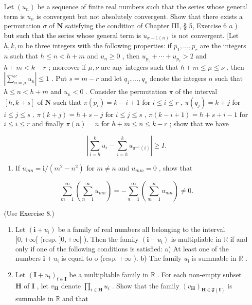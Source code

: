 \begin{enumerate}
  Let \((u_n)\) be a sequence of finite real numbers such that the series whose general term is \(u_n\) is convergent but not absolutely convergent. Show that there exists a permutation \(\sigma\) of \(\mathbf{N}\) satisfying the condition of Chapter III, § 5, Exercise 6 \(a\) ) but such that the series whose general term is \(u_{\sigma - 1(n)}\) is not convergent. {[}Let \(h, k, m\) be three integers with the following properties: if \(p_1, \ldots, p_r\) are the integers \(n\) such that \(h \leqslant n < h + m\) and \(u_n \geqslant 0\) , then \(u_{p_1} + \cdots + u_{p_r} > 2\) and \(h + m < k - r\) ; moreover if \(\mu, \nu\) are any integers such that \(h + m \leqslant \mu \leqslant \nu\) , then \(\left|\sum_{n = \mu}^{\nu} u_n\right| \leqslant 1\) . Put \(s = m - r\) and let \(q_1, \ldots, q_s\) denote the integers \(n\) such that \(h \leqslant n < h + m\) and \(u_n < 0\) . Consider the permutation \(\pi\) of the interval \([h, k + s]\) of \(\mathbf{N}\) such that \(\pi(p_i) = k - i + 1\) for \(i \leqslant i \leqslant r\) , \(\pi(q_j) = k + j\) for \(i \leqslant j \leqslant s\) , \(\pi(k + j) = h + s - j\) for \(i \leqslant j \leqslant s\) , \(\pi(k - i + 1) = h + s + i - 1\) for \(i \leqslant i \leqslant r\) and finally \(\pi(n) = n\) for \(h + m \leqslant n \leqslant k - r\) ; show that we have
\end{enumerate}

\[
\left| \sum_ {i = h} ^ {k} u _ {i} - \sum_ {i = h} ^ {k} u _ {\pi^ {- 1} (i)} \right| \geqslant I.
\]

\begin{enumerate}
\def\labelenumi{\arabic{enumi})}
\setcounter{enumi}{16}
\tightlist
\item
  If \(u_{mn} = \mathbf{i} / (m^2 - n^2)\) for \(m \neq n\) and \(u_{mm} = 0\) , show that
\end{enumerate}

\[
\sum_ {m = 1} ^ {\infty} \left(\sum_ {n = 1} ^ {\infty} u _ {m n}\right) = - \sum_ {n = 1} ^ {\infty} \left(\sum_ {m = 1} ^ {\infty} u _ {m n}\right) \neq 0.
\]

(Use Exercise 8.)

\begin{enumerate}
\def\labelenumi{\arabic{enumi})}
\setcounter{enumi}{17}
\item
  Let \((\mathbf{i} + u_{\mathfrak{i}})\) be a family of real numbers all belonging to the interval \([0, +\infty[\) (resp. \(]0, +\infty]\) ). Then the family \((\mathbf{i} + u_{\mathfrak{i}})\) is multipliable in \(\mathbb{R}\) if and only if one of the following conditions is satisfied: a) At least one of the numbers \(\mathbf{i} + u_{\mathfrak{i}}\) is equal to o (resp. \(+\infty\) ). b) The family \(u_{\mathfrak{i}}\) is summable in \(\overline{\mathbb{R}}\) .
\item
  Let \((\mathbf{I} + u_{t})_{t\in \mathbf{I}}\) be a multipliable family in \(\mathbb{R}\) . For each non-empty subset \(\mathbf{H}\) of \(\mathbf{I}\) , let \(v_{\mathbf{H}}\) denote \(\prod_{i\in \mathbf{H}}u_i\) . Show that the family \((v_{\mathbf{H}})_{\mathbf{H}\in \mathfrak{F}(\mathbf{I})}\) is summable in \(\mathbb{R}\) and that
\end{enumerate}

